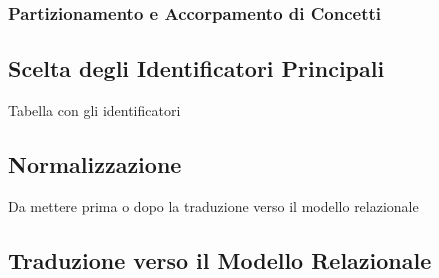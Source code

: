 		\subsubsection{Partizionamento e Accorpamento di Concetti}
	\subsection{Scelta degli Identificatori Principali}
		
		Tabella con gli identificatori
		
	\subsection{Normalizzazione}
		Da mettere prima o dopo la traduzione verso il modello relazionale
	\subsection{Traduzione verso il Modello Relazionale}
